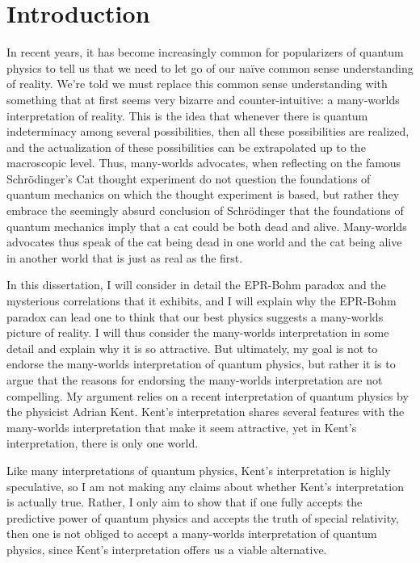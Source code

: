 \documentclass[12pt]{report}
\begin{document}
\chapter*{Introduction}
In recent years, it has become increasingly common for popularizers of quantum physics to tell us that we need to let go of our naïve common sense understanding of reality. We're told we must replace this common sense understanding with something that at first seems very bizarre and counter-intuitive: a many-worlds interpretation of reality. This is the idea that whenever there is quantum indeterminacy among several possibilities, then all these possibilities are realized, and the actualization of these possibilities can be extrapolated up to the macroscopic level. Thus, many-worlds advocates, when reflecting on the famous Schr\"{o}dinger's Cat thought experiment do not question the foundations of quantum mechanics on which the thought experiment is based, but rather they embrace the seemingly absurd conclusion of Schr\"{o}dinger that the foundations of quantum mechanics imply that a cat could be both dead and alive. Many-worlds advocates thus speak of the cat being dead in one world and the cat being alive in another world that is just as real as the first. 

In this dissertation, I will consider in detail the EPR-Bohm paradox and the mysterious correlations that it exhibits, and I will explain why the EPR-Bohm paradox can lead one to think that our best physics suggests a many-worlds picture of reality. I will thus consider the many-worlds interpretation in some detail and explain why it is so attractive. But ultimately, my goal is not to endorse the many-worlds interpretation of quantum physics, but rather it is to argue that the reasons for endorsing the many-worlds interpretation are not compelling. My argument relies on a recent interpretation of quantum physics by the physicist Adrian Kent. Kent's interpretation shares several features with the many-worlds interpretation that make it seem attractive, yet in Kent's interpretation, there is only one world.  

Like many interpretations of quantum physics, Kent's interpretation is highly speculative, so I am not making any claims about whether Kent's interpretation is actually true. Rather, I only aim to show that if one fully accepts the predictive power of quantum physics and accepts the truth of special relativity, then one is not obliged to accept a many-worlds interpretation of quantum physics, since Kent's interpretation offers us a viable alternative.
\end{document}
